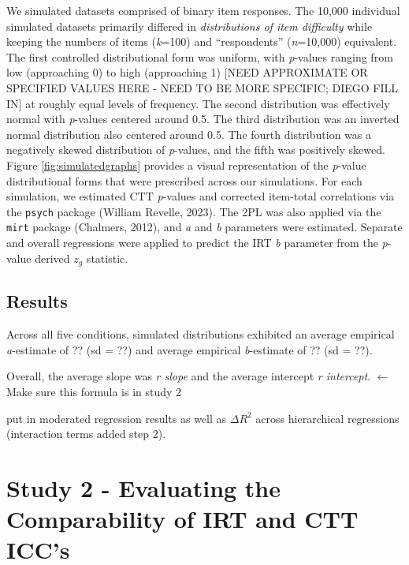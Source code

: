 \documentclass[
  jou]{apa6}
\begin{document}
We simulated datasets comprised of binary item responses. The 10,000 individual simulated datasets primarily differed in \emph{distributions of item difficulty} while keeping the numbers of items (\emph{k}=100) and ``respondents'' (\emph{n}=10,000) equivalent. The first controlled distributional form was uniform, with \emph{p}-values ranging from low (approaching 0) to high (approaching 1) {[}NEED APPROXIMATE OR SPECIFIED VALUES HERE - NEED TO BE MORE SPECIFIC; DIEGO FILL IN{]} at roughly equal levels of frequency. The second distribution was effectively normal with \emph{p}-values centered around 0.5. The third distribution was an inverted normal distribution also centered around 0.5. The fourth distribution was a negatively skewed distribution of \emph{p}-values, and the fifth was positively skewed. Figure \ref{fig:simulatedgraphs} provides a visual representation of the \emph{p}-value distributional forms that were prescribed across our simulations.
For each simulation, we estimated CTT \emph{p}-values and corrected item-total correlations via the \texttt{psych} package (William Revelle, 2023). The 2PL was also applied via the \texttt{mirt} package (Chalmers, 2012), and \emph{a} and \emph{b} parameters were estimated. Separate and overall regressions were applied to predict the IRT \emph{b} parameter from the \emph{p}-value derived \(z_g\) statistic.

\hypertarget{results}{%
\subsection{Results}\label{results}}

Across all five conditions, simulated distributions exhibited an average empirical \emph{a}-estimate of ?? (sd = ??) and average empirical \emph{b}-estimate of ?? (sd = ??).

Overall, the average slope was \emph{r slope} and the average intercept \emph{r intercept}. \(\leftarrow\) Make sure this formula is in study 2

put in moderated regression results as well as \(\Delta R^2\) across hierarchical regressions (interaction terms added step 2).

\hypertarget{study-2---evaluating-the-comparability-of-irt-and-ctt-iccs}{%
\section{Study 2 - Evaluating the Comparability of IRT and CTT ICC's}\label{study-2---evaluating-the-comparability-of-irt-and-ctt-iccs}}
\end{document}
